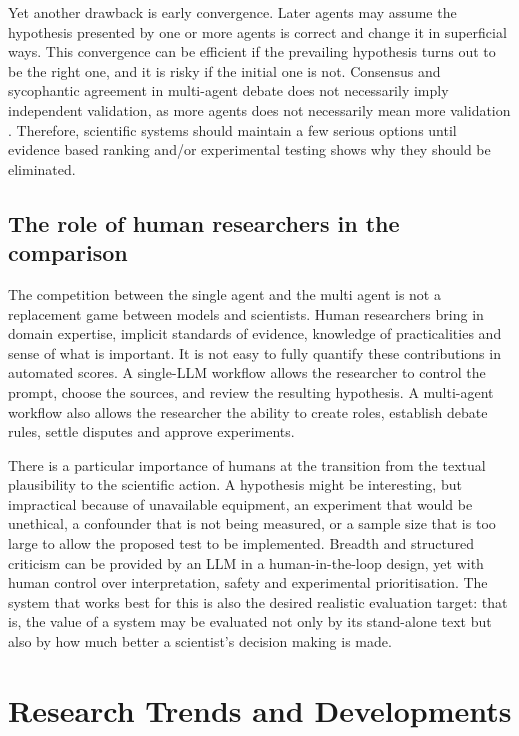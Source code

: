 \documentclass[acmsmall,screen,review]{acmart}
\begin{document}
Yet another drawback is early convergence. Later agents may assume the hypothesis presented by one or more agents is correct and change it in superficial ways. This convergence can be efficient if the prevailing hypothesis turns out to be the right one, and it is risky if the initial one is not. Consensus and sycophantic agreement in multi-agent debate does not necessarily imply independent validation, as more agents does not necessarily mean more validation \cite{choi2025debatevote}. Therefore, scientific systems should maintain a few serious options until evidence based ranking and/or experimental testing shows why they should be eliminated.


\subsection{The role of human researchers in the comparison}
\label{subsec:human-researchers}

The competition between the single agent and the multi agent is not a replacement game between models and scientists. Human researchers bring in domain expertise, implicit standards of evidence, knowledge of practicalities and sense of what is important. It is not easy to fully quantify these contributions in automated scores. A single-LLM workflow allows the researcher to control the prompt, choose the sources, and review the resulting hypothesis. A multi-agent workflow also allows the researcher the ability to create roles, establish debate rules, settle disputes and approve experiments.

There is a particular importance of humans at the transition from the textual plausibility to the scientific action. A hypothesis might be interesting, but impractical because of unavailable equipment, an experiment that would be unethical, a confounder that is not being measured, or a sample size that is too large to allow the proposed test to be implemented. Breadth and structured criticism can be provided by an LLM in a human-in-the-loop design, yet with human control over interpretation, safety and experimental prioritisation. The system that works best for this is also the desired realistic evaluation target: that is, the value of a system may be evaluated not only by its stand-alone text but also by how much better a scientist's decision making is made.


\section{Research Trends and Developments}
\label{sec:research-trends}
\end{document}
